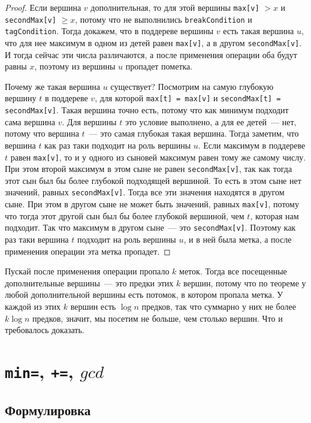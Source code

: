 \begin{proof}
    Если вершина $v$ дополнительная, то для этой вершины \verb+max[v]+ $> x$ и \verb+secondMax[v]+ $\ge x$, потому что не выполнились \verb+breakCondition+ и \verb+tagCondition+. Тогда докажем, что в поддереве вершины $v$ есть такая вершина $u$, что для нее максимум в одном из детей равен \verb+max[v]+, а в другом \verb+secondMax[v]+. И тогда сейчас эти числа различаются, а после применения операции оба будут равны $x$, поэтому из вершины $u$ пропадет пометка.

    Почему же такая вершина $u$ существует? Посмотрим на самую глубокую вершину $t$ в поддереве $v$, для которой \verb+max[t] = max[v]+ и \verb+secondMax[t] = secondMax[v]+. Такая вершина точно есть, потому что как минимум подходит сама вершина $v$. Для вершины $t$ это условие выполнено, а для ее детей~--- нет, потому что вершина $t$~--- это самая глубокая такая вершина. Тогда заметим, что вершина $t$ как раз таки подходит на роль вершины $u$. Если максимум в поддереве $t$ равен \verb+max[v]+, то и у одного из сыновей максимум равен тому же самому числу. При этом второй максимум в этом сыне не равен \verb+secondMax[v]+, так как тогда этот сын был бы более глубокой подходящей вершиной. То есть в этом сыне нет значений, равных \verb+secondMax[v]+. Тогда все эти значения находятся в другом сыне. При этом в другом сыне не может быть значений, равных \verb+max[v]+, потому что тогда этот другой сын был бы более глубокой вершиной, чем $t$, которая нам подходит. Так что максимум в другом сыне~--- это \verb+secondMax[v]+. Поэтому как раз таки вершина $t$ подходит на роль вершины $u$, и в ней была метка, а после применения операции эта метка пропадет.
\end{proof}

Пускай после применения операции пропало $k$ меток. Тогда все посещенные дополнительные вершины~--- это предки этих $k$ вершин, потому что по теореме у любой дополнительной вершины есть потомок, в котором пропала метка. У каждой из этих $k$ вершин есть $\log n$ предков, так что суммарно у них не более $k \log n$ предков, значит, мы посетим не больше, чем столько вершин. Что и требовалось доказать.




\cprotect \section{\verb+min=+, \verb^+=^, $gcd$}

\subsection{Формулировка}

